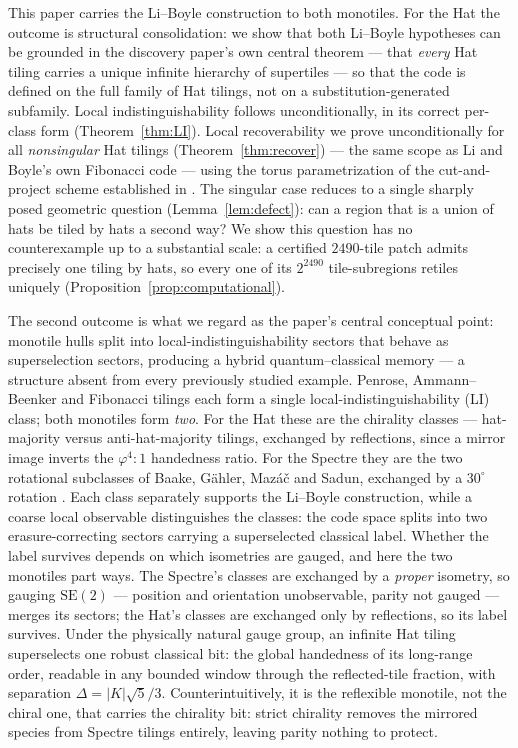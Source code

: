 \documentclass[a4paper,unpublished]{quantumarticle}
\theoremstyle{remark}
\newcommand{\SEtwo}{\mathrm{SE}(2)}
\newcommand{\gphi}{\varphi}
\begin{document}
This paper carries the Li--Boyle construction to both monotiles. For
the Hat the outcome is structural consolidation: we show that both
Li--Boyle hypotheses can be grounded in the discovery paper's own
central theorem --- that \emph{every} Hat tiling carries a unique
infinite hierarchy of supertiles \cite[Thm.~5.1]{Smith2024hat} --- so
that the code is defined on the full family of Hat tilings, not on a
substitution-generated subfamily. Local indistinguishability follows
unconditionally, in its correct per-class form
(Theorem~\ref{thm:LI}). Local recoverability we
prove unconditionally for all \emph{nonsingular} Hat tilings
(Theorem~\ref{thm:recover}) --- the same scope as Li and Boyle's own
Fibonacci code --- using the torus parametrization of the
cut-and-project scheme established in \cite{BGS2025}. The singular case reduces to a single sharply posed geometric
question (Lemma~\ref{lem:defect}): can a region that is a union of
hats be tiled by hats a second way? We show this question has no counterexample up to a substantial
scale: a certified $2490$-tile patch admits precisely one tiling by
hats, so every one of its $2^{2490}$ tile-subregions retiles uniquely
(Proposition~\ref{prop:computational}).

The second outcome is what we regard as the paper's central
conceptual point: monotile hulls split into local-indistinguishability
sectors that behave as superselection sectors, producing a hybrid
quantum--classical memory --- a structure absent from every
previously studied example. Penrose, Ammann--Beenker and Fibonacci tilings each
form a single local-indistinguishability (LI) class; both monotiles
form \emph{two}. For the Hat these are the chirality classes ---
hat-majority versus anti-hat-majority tilings, exchanged by
reflections, since a mirror image inverts the $\gphi^{4}{:}1$
handedness ratio. For the Spectre they are the two rotational
subclasses of Baake, G\"ahler, Maz\'a\v{c} and Sadun, exchanged by
a $30^{\circ}$ rotation \cite{BGMS2025}. Each class separately supports the Li--Boyle construction, while a
coarse local observable distinguishes the classes: the code space
splits into two erasure-correcting sectors carrying a superselected
classical label. Whether the label survives depends on which
isometries are gauged,
and here the two monotiles part ways. The Spectre's classes are
exchanged by a \emph{proper} isometry, so gauging $\SEtwo$ ---
position and orientation unobservable, parity not gauged --- merges
its sectors; the Hat's classes are exchanged only by reflections, so
its label survives. Under the physically natural gauge group, an
infinite Hat tiling superselects one robust classical bit: the global
handedness of its long-range order, readable in any bounded window
through the reflected-tile fraction, with separation
$\Delta = |K|\sqrt{5}/3$. Counterintuitively, it is the reflexible
monotile, not the chiral one, that carries the chirality bit: strict
chirality removes the mirrored species from Spectre tilings entirely,
leaving parity nothing to protect.
\end{document}
